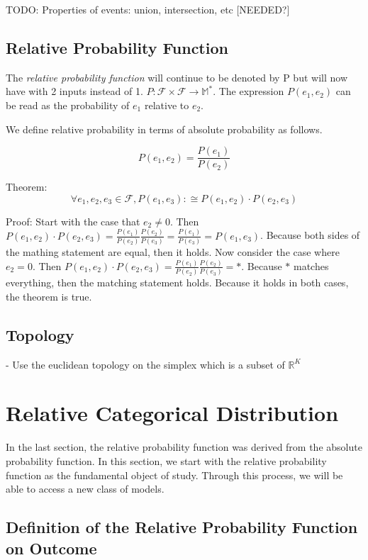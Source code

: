\documentclass[twoside]{article}
\begin{document}
TODO: Properties of events: union, intersection, etc [NEEDED?]

\subsection{Relative Probability Function}

The \textit{relative probability function} will continue to be denoted by P but will now have with 2 inputs instead of 1. \(P: \mathcal{F} \times \mathcal{F} \rightarrow \mathbb{M}^*\). The expression \(P(e_1, e_2)\) can be read as the probability of \(e_1\) relative to \(e_2\).

We define relative probability in terms of absolute probability as follows.

\[P(e_1, e_2) = \frac{P(e_1)}{P(e_2)}\]

Theorem: \[\forall e_1, e_2, e_3 \in \mathcal{F}, P(e_1, e_3) :\cong P(e_1, e_2) \cdot P(e_2, e_3)\]

Proof: Start with the case that \(e_2 \neq 0\). Then \(P(e_1, e_2) \cdot P(e_2, e_3) = \frac{P(e_1)}{P(e_2)}\frac{P(e_2)}{P(e_3)} = \frac{P(e_1)}{P(e_3)} = P(e_1, e_3)\). Because both sides of the mathing statement are equal, then it holds.
Now consider the case where \(e_2 = 0\).  Then \(P(e_1, e_2) \cdot P(e_2, e_3) = \frac{P(e_1)}{P(e_2)}\frac{P(e_2)}{P(e_3)} = \ast\). Because \(\ast\) matches everything, then the matching statement holds. Because it holds in both cases, the theorem is true.

\subsection{Topology}

- Use the euclidean topology on the simplex which is a subset of \(\mathbb{R}^K\)

\section{Relative Categorical Distribution}

In the last section, the relative probability function was derived from the absolute probability function. In this section, we start with the relative probability function as the fundamental object of study. Through this process, we will be able to access a new class of models.

\subsection{Definition of the Relative Probability Function on Outcome}
\end{document}

